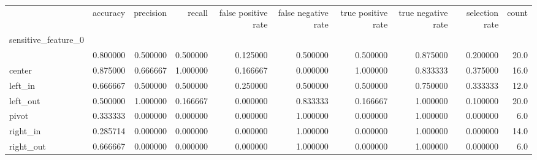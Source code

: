\begin{tabular}{lrrrrrrrrr}
\toprule
{} &  accuracy &  precision &    recall &  false positive rate &  false negative rate &  true positive rate &  true negative rate &  selection rate &  count \\
sensitive\_feature\_0 &           &            &           &                      &                      &                     &                     &                 &        \\
\midrule
                    &  0.800000 &   0.500000 &  0.500000 &             0.125000 &             0.500000 &            0.500000 &            0.875000 &        0.200000 &   20.0 \\
center              &  0.875000 &   0.666667 &  1.000000 &             0.166667 &             0.000000 &            1.000000 &            0.833333 &        0.375000 &   16.0 \\
left\_in             &  0.666667 &   0.500000 &  0.500000 &             0.250000 &             0.500000 &            0.500000 &            0.750000 &        0.333333 &   12.0 \\
left\_out            &  0.500000 &   1.000000 &  0.166667 &             0.000000 &             0.833333 &            0.166667 &            1.000000 &        0.100000 &   20.0 \\
pivot               &  0.333333 &   0.000000 &  0.000000 &             0.000000 &             1.000000 &            0.000000 &            1.000000 &        0.000000 &    6.0 \\
right\_in            &  0.285714 &   0.000000 &  0.000000 &             0.000000 &             1.000000 &            0.000000 &            1.000000 &        0.000000 &   14.0 \\
right\_out           &  0.666667 &   0.000000 &  0.000000 &             0.000000 &             1.000000 &            0.000000 &            1.000000 &        0.000000 &    6.0 \\
\bottomrule
\end{tabular}
